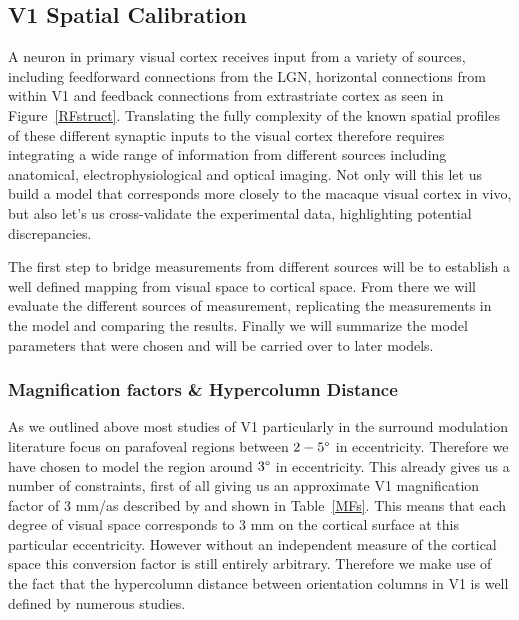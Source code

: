 \subsection{V1 Spatial Calibration}

A neuron in primary visual cortex receives input from a variety of
sources, including feedforward connections from the LGN, horizontal
connections from within V1 and feedback connections from extrastriate
cortex as seen in Figure~\ref{RFstruct}. Translating the fully
complexity of the known spatial profiles of these different synaptic
inputs to the visual cortex therefore requires integrating a wide
range of information from different sources including anatomical,
electrophysiological and optical imaging. Not only will this let us
build a model that corresponds more closely to the macaque visual
cortex in vivo, but also let's us cross-validate the experimental
data, highlighting potential discrepancies.

The first step to bridge measurements from different sources will be
to establish a well defined mapping from visual space to cortical
space. From there we will evaluate the different sources of
measurement, replicating the measurements in the model and comparing
the results. Finally we will summarize the model parameters that were
chosen and will be carried over to later models.

\subsubsection*{Magnification factors \& Hypercolumn Distance} \label{SCALHypercolumns}

As we outlined above most studies of V1 particularly in the surround
modulation literature focus on parafoveal regions between $2-5\degree$
in eccentricity. Therefore we have chosen to model the region around
$3\degree$ in eccentricity. This already gives us a number of
constraints, first of all giving us an approximate V1 magnification
factor of 3 mm/\degree as described by \cite{VanEssen1984} and shown
in Table~\ref{MFs}. This means that each degree of visual space
corresponds to 3 mm on the cortical surface at this particular
eccentricity. However without an independent measure of the cortical
space this conversion factor is still entirely arbitrary. Therefore we
make use of the fact that the hypercolumn distance between orientation
columns in V1 is well defined by numerous studies.

